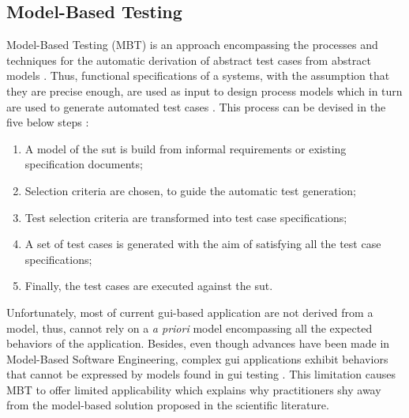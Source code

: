 \subsection{Model-Based Testing}
\label{sec:introduction-model-based-testing}

Model-Based Testing (MBT) is an approach encompassing the processes and techniques for the automatic derivation of abstract test cases from abstract models \cite{Utting2012}. Thus, functional specifications of a systems, with the assumption that they are precise enough, are used as input to design process models which in turn are used to generate automated test cases \cite{Gupta2011}. This process can be devised in the five below steps \cite{Utting2012}:

\begin{enumerate}
    \item A model of the \gls{sut} is build from informal requirements or existing specification documents;
    \item Selection criteria are chosen, to guide the automatic test generation;
    \item Test selection criteria are transformed into test case specifications;
    \item A set of test cases is generated with the aim of satisfying all the test case specifications;
    \item Finally, the test cases are executed against the \gls{sut}.
\end{enumerate}

Unfortunately, most of current \gls{gui}-based application are not derived from a model, thus, cannot rely on a \emph{a priori} model encompassing all the expected behaviors of the application. Besides, even though advances have been made in Model-Based Software Engineering, complex \gls{gui} applications exhibit behaviors that cannot be expressed by models found in \gls{gui} testing \cite{Lelli2015}. This limitation causes MBT to offer limited applicability which explains why practitioners shy away from the model-based solution proposed in the scientific literature.

